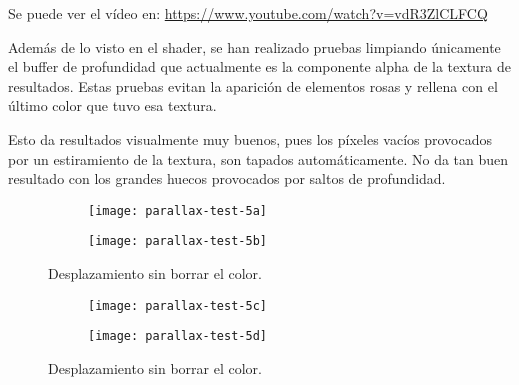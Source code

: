 Se puede ver el vídeo en: \url{https://www.youtube.com/watch?v=vdR3ZlCLFCQ}

Además de lo visto en el shader, se han realizado pruebas limpiando únicamente el buffer de profundidad que actualmente es la componente alpha de la textura de resultados. Estas pruebas evitan la aparición de elementos rosas y rellena con el último color que tuvo esa textura. 

Esto da resultados visualmente muy buenos, pues los píxeles vacíos provocados por un estiramiento de la textura, son tapados automáticamente. No da tan buen resultado con los grandes huecos provocados por saltos de profundidad.

\begin{figure}[H]
\centering
\begin{subfigure}{.47\linewidth}
	\centering
  \texttt{[image: parallax-test-5a]}
  \caption{}
  \label{fig:parallax-test-5-a}
\end{subfigure}%
\hspace{.05\linewidth}
\begin{subfigure}{.47\linewidth}
	\centering
  \texttt{[image: parallax-test-5b]}
  \caption{}
  \label{fig:parallax-test-5-b}
\end{subfigure}
\caption{Desplazamiento sin borrar el color.}
\label{fig:parallax-test-5ab}
\end{figure}

\begin{figure}[H]
\centering
\begin{subfigure}{.47\linewidth}
	\centering
  \texttt{[image: parallax-test-5c]}
  \caption{}
  \label{fig:parallax-test-5-c}
\end{subfigure}%
\hspace{.05\linewidth}
\begin{subfigure}{.47\linewidth}
	\centering
  \texttt{[image: parallax-test-5d]}
  \caption{}
  \label{fig:parallax-test-5-d}
\end{subfigure}
\caption{Desplazamiento sin borrar el color.}
\label{fig:parallax-test-5cd}
\end{figure}
\FloatBarrier






